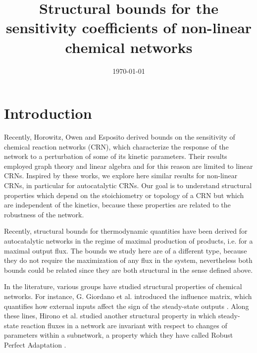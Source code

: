 \documentclass{article}
\title{Structural bounds for the sensitivity coefficients of non-linear chemical networks}
\date{\today}
\begin{document}
	
	\maketitle
	
	\section{Introduction}
	Recently, Horowitz, Owen \cite{1} and Esposito \cite{2} derived bounds on the sensitivity of chemical reaction networks (CRN), which characterize the response of the network to a perturbation of some of its kinetic parameters. Their results employed graph theory and linear algebra and for this reason are limited to linear CRNs. Inspired by these works, we explore here similar results for non-linear CRNs, in particular for autocatalytic CRNs. Our goal is to understand structural properties which depend on the stoichiometry or topology of a CRN but which are independent of the kinetics, because these properties are related to the robustness of the network.
	
	Recently, structural bounds for thermodynamic quantities have been derived for autocatalytic networks \cite{4} in the regime of maximal production of products, i.e. for a maximal output flux. The bounds we study here are of a different type, because they do not require the maximization of any flux in the system, nevertheless both bounds could be related since they are both structural in the sense defined above.
	
	In the literature, various groups have studied structural properties of chemical networks. For instance, G. Giordano et al. introduced the influence matrix, which quantifies how external inputs affect the sign of the steady-state outputs \cite{giordano_computing_2016}. Along these lines, Hirono et al. studied another structural property in which steady-state reaction fluxes in a network are invariant with respect to changes of parameters within a subnetwork, a property which they have called Robust Perfect Adaptation  \cite{5,6}. 
	
\end{document}
